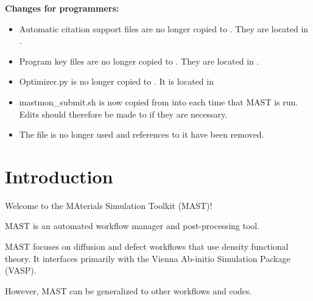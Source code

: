 \documentclass[letterpaper,10pt,english]{sphinxmanual}
\begin{document}
\textbf{Changes for programmers:}
\begin{itemize}
\item {} 
Automatic citation support files are no longer copied to . They are located in .

\item {} 
Program key files are no longer copied to . They are located in .

\item {} 
Optimizer.py is no longer copied to . It is located in 

\item {} 
mastmon\_submit.sh is now copied from  into  each time that MAST is run. Edits should therefore be made to  if they are necessary.

\item {} 
The  file is no longer used and references to it have been removed.

\end{itemize}


\chapter{Introduction}
\label{0_0_introduction:introduction}\label{0_0_introduction::doc}
Welcome to the MAterials Simulation Toolkit (MAST)!

MAST is an automated workflow manager and post-processing tool.

MAST focuses on diffusion and defect workflows that use density functional theory. It interfaces primarily with the Vienna Ab-initio Simulation Package (VASP).

However, MAST can be generalized to other workflows and codes.
\end{document}
